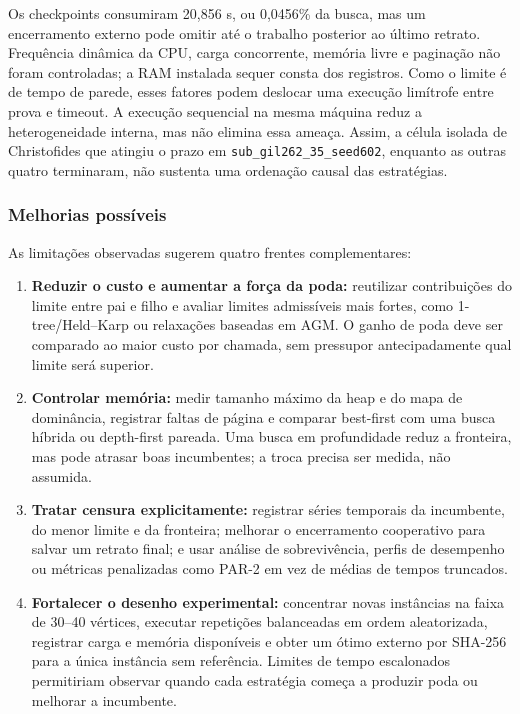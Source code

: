 \documentclass[12pt]{article}
\begin{document}
Os checkpoints consumiram 20,856 s, ou 0,0456\% da busca, mas um encerramento
externo pode omitir até o trabalho posterior ao último retrato. Frequência
dinâmica da CPU, carga concorrente, memória livre e paginação não foram
controladas; a RAM instalada sequer consta dos registros. Como o limite é de
tempo de parede, esses fatores podem deslocar uma execução limítrofe entre prova
e timeout. A execução sequencial na mesma máquina reduz a heterogeneidade
interna, mas não elimina essa ameaça. Assim, a célula isolada de Christofides que
atingiu o prazo em \texttt{sub\_gil262\_35\_seed602}, enquanto as outras quatro
terminaram, não sustenta uma ordenação causal das estratégias.

\subsubsection{Melhorias possíveis}

As limitações observadas sugerem quatro frentes complementares:

\begin{enumerate}
  \item \textbf{Reduzir o custo e aumentar a força da poda:} reutilizar
  contribuições do limite entre pai e filho e avaliar limites admissíveis mais
  fortes, como 1-tree/Held--Karp ou relaxações baseadas em AGM. O ganho de poda
  deve ser comparado ao maior custo por chamada, sem pressupor antecipadamente
  qual limite será superior.
  \item \textbf{Controlar memória:} medir tamanho máximo da heap e do mapa de
  dominância, registrar faltas de página e comparar best-first com uma busca
  híbrida ou depth-first pareada. Uma busca em profundidade reduz a fronteira,
  mas pode atrasar boas incumbentes; a troca precisa ser medida, não assumida.
  \item \textbf{Tratar censura explicitamente:} registrar séries temporais da
  incumbente, do menor limite e da fronteira; melhorar o encerramento cooperativo
  para salvar um retrato final; e usar análise de sobrevivência, perfis de
  desempenho ou métricas penalizadas como PAR-2 em vez de médias de tempos
  truncados.
  \item \textbf{Fortalecer o desenho experimental:} concentrar novas instâncias
  na faixa de 30--40 vértices, executar repetições balanceadas em ordem
  aleatorizada, registrar carga e memória disponíveis e obter um ótimo externo
  por SHA-256 para a única instância sem referência. Limites de tempo
  escalonados permitiriam observar quando cada estratégia começa a produzir
  poda ou melhorar a incumbente.
\end{enumerate}
\end{document}
